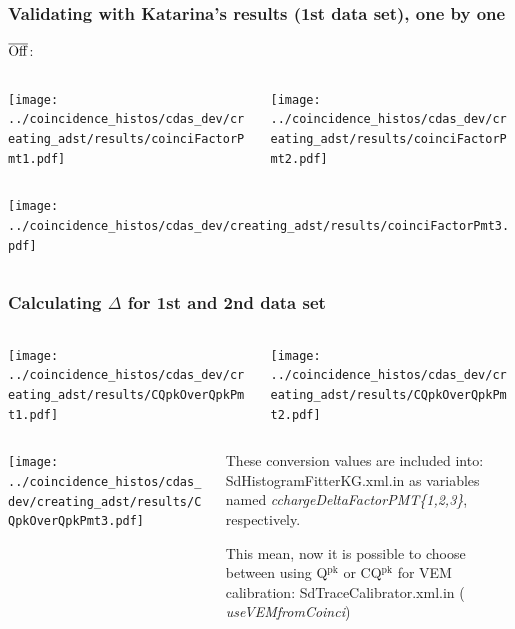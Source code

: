 \documentclass[aspectratio=169]{beamer}
\def\Offline{\mbox{$\overline{\rm Off}$\hspace{.05em}\raisebox{.4ex}{$\underline{\rm line}$}}\xspace}
\begin{document}
\begin{frame}
  \frametitle{Validating with Katarina's results (1st data set),
  one by one}

  \Offline:
  \begin{columns}
    \centering
    \begin{column}{0.5\textwidth}
      \texttt{[image: ../coincidence\_histos/cdas\_dev/creating\_adst/results/coinciFactorPmt1.pdf]}
    \end{column}
    \begin{column}{0.5\textwidth}
      \texttt{[image: ../coincidence\_histos/cdas\_dev/creating\_adst/results/coinciFactorPmt2.pdf]}
    \end{column}
  \end{columns}

  \begin{columns}
    \centering
    \begin{column}{0.5\textwidth}
      \texttt{[image: ../coincidence\_histos/cdas\_dev/creating\_adst/results/coinciFactorPmt3.pdf]}
    \end{column}
  \end{columns}
\end{frame}

\begin{frame}
  \frametitle{Calculating $\Delta$ for 1st and 2nd data set}
  \vspace{0.2cm}

  \begin{columns}
    \centering
    \begin{column}{0.5\textwidth}
      \texttt{[image: ../coincidence\_histos/cdas\_dev/creating\_adst/results/CQpkOverQpkPmt1.pdf]}
    \end{column}
    \begin{column}{0.5\textwidth}
      \texttt{[image: ../coincidence\_histos/cdas\_dev/creating\_adst/results/CQpkOverQpkPmt2.pdf]}
    \end{column}
  \end{columns}
  \begin{columns}
    \centering
    \begin{column}{0.5\textwidth}
      \texttt{[image: ../coincidence\_histos/cdas\_dev/creating\_adst/results/CQpkOverQpkPmt3.pdf]}
    \end{column}
    \begin{column}{0.5\textwidth}
      {\small
      These conversion values are included into:
      SdHistogramFitterKG.xml.in as variables named
      {\it cchargeDeltaFactorPMT\{1,2,3\}}, respectively.
      \vspace{0.2cm}

      This mean, now it is possible to choose between using
      Q$^{\mathrm{pk}}$ or CQ$^{\mathrm{pk}}$ for VEM
      calibration: SdTraceCalibrator.xml.in ({\it
      useVEMfromCoinci})
      }
    \end{column}
  \end{columns}
\end{frame}
\end{document}
